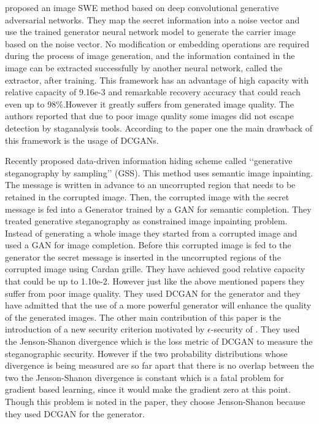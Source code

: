 \documentclass[../main/main.tex]{subfiles}
\begin{document}
	  \cite{Hu2018} proposed an image \gls{SWE} method based on deep convolutional generative adversarial networks. They map the secret information into a noise vector and use the trained generator neural network model to generate the carrier image based on the noise vector. No modification or embedding operations are required during the process of image generation, and the information contained in the image can be extracted successfully by another neural network, called the extractor, after training. This framework has an advantage of high capacity with relative capacity of 9.16e-3 and remarkable recovery accuracy that could reach even up to 98\%.However it greatly suffers from generated image quality. The authors reported that due to poor image quality some images did not escape detection by staganalysis tools.  According to the paper one the main drawback of this framework is the usage of \gls{DCGAN}s.
	  
	  Recently \cite{Zhang2019} proposed data-driven information hiding scheme called ‘‘generative steganography by sampling’’ (\gls{GSS}). This method uses semantic image inpainting. The message is written in advance to an uncorrupted region that needs to be retained in the corrupted image. Then, the corrupted image with the secret message is fed into a Generator trained by a \gls{GAN} for semantic completion. They treated generative steganography as constrained image inpainting problem. Instead of generating a whole image they started from a corrupted image and used a \gls{GAN} for image completion. Before this corrupted image is fed to the generator the secret message is inserted in the uncorrupted regions of the corrupted image using Cardan grille. They have achieved good relative capacity that could be up to 1.10e-2. However just like the above mentioned papers they suffer from poor image quality. They used \gls{DCGAN} for the generator and they have admitted that the use of a more powerful generator will enhance the quality of the generated images. The other main contribution of this paper is the introduction of a new security criterion motivated by $\epsilon$-security of \cite{Cachin1998}. They used the Jenson-Shanon divergence which is the loss metric of \gls{DCGAN} to measure the steganographic security. However if the two probability distributions whose divergence is being measured are so far apart that there is no overlap between the two the Jenson-Shanon divergence is constant which is a fatal problem for gradient based learning, since it would make the gradient zero at this point. Though this problem is noted in the paper, they choose Jenson-Shanon because they used \gls{DCGAN} for the generator.    %
	 
\end{document}
